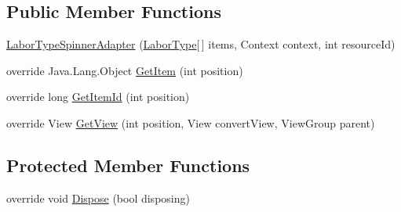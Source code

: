\subsection*{Public Member Functions}
\begin{DoxyCompactItemize}
\item 
\hyperlink{class_field_service_1_1_android_1_1_labor_type_spinner_adapter_a49e2bebf5a5ea38b3f6a2d66f73628c5}{Labor\+Type\+Spinner\+Adapter} (\hyperlink{namespace_field_service_1_1_data_a20c89d9b67c465f840b3ef27a026afd6}{Labor\+Type}\mbox{[}$\,$\mbox{]} items, Context context, int resource\+Id)
\item 
override Java.\+Lang.\+Object \hyperlink{class_field_service_1_1_android_1_1_labor_type_spinner_adapter_ab3f627fb9f5099e19c2d0ea968e27715}{Get\+Item} (int position)
\item 
override long \hyperlink{class_field_service_1_1_android_1_1_labor_type_spinner_adapter_a12e8c976952095aef123fbee7727c05d}{Get\+Item\+Id} (int position)
\item 
override View \hyperlink{class_field_service_1_1_android_1_1_labor_type_spinner_adapter_a30fe7d5aa8efe1ea748f0b9bde3b0088}{Get\+View} (int position, View convert\+View, View\+Group parent)
\end{DoxyCompactItemize}
\subsection*{Protected Member Functions}
\begin{DoxyCompactItemize}
\item 
override void \hyperlink{class_field_service_1_1_android_1_1_labor_type_spinner_adapter_a72c4d21b83a1d9c9267cd37b011aa841}{Dispose} (bool disposing)
\end{DoxyCompactItemize}
